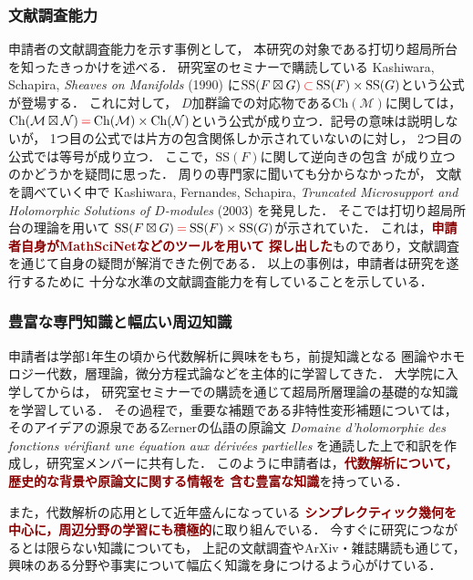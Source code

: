 \documentclass[10pt,a4paper,uplatex,dvipdfmx]{ujarticle} 		%
\newcommand{\研究課題名}{打切り超局所台の関手的性質の研究とMorse理論への応用}
\newcommand{\研究機関名}{北海道大学}
\newcommand{\研究代表者氏名}{大柴寿浩}
\begin{document}
\subsubsection*{文献調査能力}
申請者の文献調査能力を示す事例として，
本研究の対象である打切り超局所台を知ったきっかけを述べる．
研究室のセミナーで購読している Kashiwara, Schapira, 
\textit{Sheaves on Manifolds} (1990) 
に\(
	\mathrm{SS}(F\boxtimes G)
	\mathbin{\textcolor{darkred}{\mathbf{\subset}}} 
	\mathrm{SS}(F)\times\mathrm{SS}(G)
\)という公式が登場する．
これに対して，
\(D\)加群論での対応物である\(\mathrm{Ch}(\mathcal{M})\)に関しては，
\(
	\mathrm{Ch}(\mathcal{M}\boxtimes \mathcal{N})
	\mathbin{\textcolor{darkred}{\mathbf{=}}} 
	\mathrm{Ch}(\mathcal{M})\times\mathrm{Ch}(\mathcal{N})
\)という公式が成り立つ．記号の意味は説明しないが，
1つ目の公式では片方の包含関係しか示されていないのに対し，
2つ目の公式では等号が成り立つ．
ここで，\(\mathrm{SS}(F)\)に関して逆向きの包含
が成り立つのかどうかを疑問に思った．
周りの専門家に聞いても分からなかったが，
文献を調べていく中で Kashiwara, Fernandes, Schapira, 
\textit{Truncated Microsupport and 
Holomorphic Solutions of \(D\)-modules} (2003) を発見した．
そこでは打切り超局所台の理論を用いて
\(
	\mathrm{SS}(F\boxtimes G)
	\mathbin{\textcolor{darkred}{\mathbf{=}}} 
	\mathrm{SS}(F)\times\mathrm{SS}(G)
\)が示されていた．
これは，\textcolor{darkred}{\textbf{申請者自身がMathSciNetなどのツールを用いて
探し出した}}ものであり，文献調査を通じて自身の疑問が解消できた例である．
以上の事例は，申請者は研究を遂行するために
十分な水準の文献調査能力を有していることを示している．
\subsubsection*{豊富な専門知識と幅広い周辺知識}
申請者は学部1年生の頃から代数解析に興味をもち，前提知識となる
圏論やホモロジー代数，層理論，微分方程式論などを主体的に学習してきた．
大学院に入学してからは，
研究室セミナーでの購読を通じて超局所層理論の基礎的な知識を学習している．
その過程で，重要な補題である非特性変形補題については，
そのアイデアの源泉であるZernerの仏語の原論文
\textit{Domaine d'holomorphie des fonctions v\'erifiant 
une \'equation aux d\'eriv\'ees partielles} 
を通読した上で和訳を作成し，研究室メンバーに共有した．
このように申請者は，\textcolor{darkred}{\textbf{代数解析について，
歴史的な背景や原論文に関する情報を
含む豊富な知識}}を持っている．

また，代数解析の応用として近年盛んになっている
\textcolor{darkred}{\textbf{シンプレクティック幾何を中心に，周辺分野の学習にも積極的}}に取り組んでいる．
今すぐに研究につながるとは限らない知識についても，
上記の文献調査やArXiv・雑誌購読も通じて，
興味のある分野や事実について幅広く知識を身につけるよう心がけている．
\end{document}
